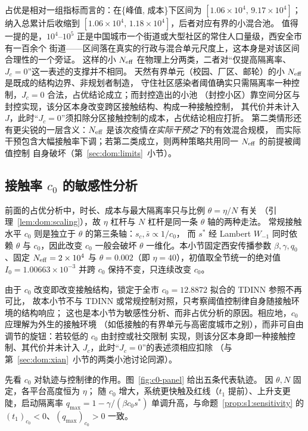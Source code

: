 \documentclass[lang=cn,a4paper,newtx]{elegantpaper}
\numberwithin{equation}{section}
\theoremstyle{plain}
\begin{document}
\begin{remark}[指标依赖性与小池的物理含义]
占优是相对一组指标而言的：在\{峰值, 成本\}下区间为 $[1.06\times10^4,\,9.17\times10^4]$；
纳入总累计后收缩到 $[1.06\times10^4,\,1.18\times10^4]$，后者对应有界的小混合池。
值得一提的是，$10^4$--$10^5$ 正是中国城市一个街道或大型社区的常住人口量级，西安全市有一百余个
街道——区间落在真实的行政与混合单元尺度上，这本身是对该区间合理性的一个旁证。
这样的小 $N_{\rm eff}$ 在物理上分两类，二者对“仅提高隔离率、$J_c=0$”这一表述的支撑并不相同。
天然有界单元（校园、厂区、邮轮）的小 $N_{\rm eff}$ 是既成的结构边界、非规划者制造，
守住社区感染者阈值确实只需隔离率一种控制，$J_c=0$ 合法，占优结论成立；而封控造出的小池
（封控小区）靠空间分区与封控实现，该分区本身改变跨区接触结构、构成一种接触控制，
其代价并未计入 $J$，此时“$J_c=0$”须扣除分区接触控制的成本，占优结论相应打折。
第二类情形还有更尖锐的一层含义：$N_{\rm eff}$ 是该次疫情\emph{在实际干预之下}的有效混合规模，
而实际干预包含大幅接触率下调；若第二类成立，则两种策略共用同一 $N_{\rm eff}$ 的前提被阈值控制
自身破坏（第~\ref{sec:dom:limits}~小节）。
\end{remark}

\subsection{接触率 $c_0$ 的敏感性分析}
\label{sec:dom:c0}

前面的占优分析中，时长、成本与最大隔离率只与比例 $\theta=\eta/N$ 有关
（引理~\ref{lem:dom:scaling}），故 $\eta$ 杠杆与 $N$ 杠杆是同一条 $\theta$ 轴的两种走法。
常规接触水平 $c_0$ 则是独立于 $\theta$ 的第三条轴：$s_c,\bar s\propto1/c_0$，
而 $s^*$ 经 Lambert $W_{-1}$ 同时依赖 $\theta$ 与 $c_0$，因此改变 $c_0$ 一般会破坏
$\theta$ 一维化。本小节固定西安传播参数 $\beta,\gamma,q_0$、固定 $N_{\rm eff}=2\times10^4$
与 $\theta=0.002$（即 $\eta=40$），初值取全节统一的绝对值 $I_0=1.00663\times10^{-3}$ 并跨 $c_0$
保持不变，只连续改变 $c_0$。

由于 $c_0$ 改变即改变接触结构，锁定于全市 $c_0=12.8872$ 拟合的 TDINN 参照不再可比，
故本小节不与 TDINN 或常规控制对照，只考察阈值控制律自身随接触环境的结构响应；
这也是本小节为敏感性分析、而非占优分析的原因。相应地，$c_0$ 应理解为外生的接触环境
（如低接触的有界单元与高密度城市之别），而非可自由调节的旋钮：若较低的 $c_0$ 由封控或社交限制
实现，则该分区本身即一种接触控制、其代价并未计入 $J_c$，此时“$J_c=0$”的表述须相应扣除
（与第~\ref{sec:dom:xian}~小节的两类小池讨论同源）。

先看 $c_0$ 对轨迹与控制律的作用。图~\ref{fig:c0-panel} 给出五条代表轨迹。
因 $\theta,N$ 固定，各平台高度恒为 $\eta$；
随 $c_0$ 增大，系统更快触及红线（$t_1$ 提前）、上升支更陡，启动隔离率
$q_{\max}=1-\gamma/(\beta c_0 s^*)$ 单调升高，与命题~\ref{prop:s1:sensitivity} 的
$(t_1)_{c_0}<0$、$(q_{\max})_{c_0}>0$ 一致。
\end{document}
